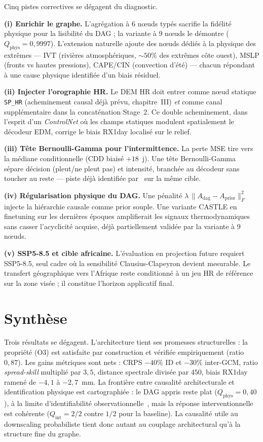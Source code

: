 \documentclass[14pt,a4paper,openany]{extreport}
\newcommand{\Adag}{\ensuremath{A_{\mathrm{dag}}}}
\begin{document}
Cinq pistes correctives se dégagent du diagnostic.

\textbf{(i) Enrichir le graphe.} L'agrégation à 6 nœuds typés sacrifie la fidélité physique pour la lisibilité du DAG ; la variante à 9 nœuds le démontre ($Q_{\mathrm{phys}}=0{,}9997$). L'extension naturelle ajoute des nœuds dédiés à la physique des extrêmes --- IVT (rivières atmosphériques, $\sim 50\%$ des extrêmes côte ouest), MSLP (fronts vs hautes pressions), CAPE/CIN (convection d'été) --- chacun répondant à une cause physique identifiée d'un biais résiduel.

\textbf{(ii) Injecter l'orographie HR.} Le DEM HR doit entrer comme nœud statique \texttt{SP\_HR} (acheminement causal déjà prévu, chapitre~III) \emph{et} comme canal supplémentaire dans la concaténation Stage~2. Ce double acheminement, dans l'esprit d'un \emph{ControlNet} où les champs statiques modulent spatialement le décodeur EDM, corrige le biais RX1day localisé sur le relief.

\textbf{(iii) Tête Bernoulli-Gamma pour l'intermittence.} La perte MSE tire vers la médiane conditionnelle (CDD biaisé $+18$~j). Une tête Bernoulli-Gamma~\cite{maraun_widmann_2018} sépare décision (pleut/ne pleut pas) et intensité, branchée au décodeur sans toucher au reste --- piste déjà identifiée par~\cite{rampal_cgan_2024} sur la même cible.

\textbf{(iv) Régularisation physique du DAG.} Une pénalité $\lambda \, \|\Adag - A_{\mathrm{prior}}\|_F^2$ injecte la hiérarchie causale comme prior souple. Une variante CASTLE en finetuning sur les dernières époques amplifierait les signaux thermodynamiques sans casser l'acyclicité acquise, déjà partiellement validée par la variante à 9 nœuds.

\textbf{(v) SSP5-8.5 et cible africaine.} L'évaluation en projection future requiert SSP5-8.5, seul cadre où la sensibilité Clausius-Clapeyron devient mesurable. Le transfert géographique vers l'Afrique reste conditionné à un jeu HR de référence sur la zone visée ; il constitue l'horizon applicatif final.

\section{Synthèse}
\label{sec:exp-synthese}

Trois résultats se dégagent. L'architecture tient ses promesses structurelles : la propriété (O3) est satisfaite par construction et vérifiée empiriquement (ratio $0{,}87$). Les gains métriques sont nets : CRPS $-40\%$ ID et $-30\%$ inter-GCM, ratio \emph{spread-skill} multiplié par $3{,}5$, distance spectrale divisée par $450$, biais RX1day ramené de $-4{,}1$ à $-2{,}7$~mm. La frontière entre causalité architecturale et identification physique est cartographiée : le DAG appris reste plat ($Q_{\mathrm{phys}}=0{,}40$), à la limite d'identifiabilité observationnelle~\cite{pearl_causality_2009}, mais la réponse interventionnelle est cohérente ($Q_{\mathrm{int}}=2/2$ contre $1/2$ pour la baseline). La causalité utile au downscaling probabiliste tient donc autant au couplage architectural qu'à la structure fine du graphe.
\end{document}
